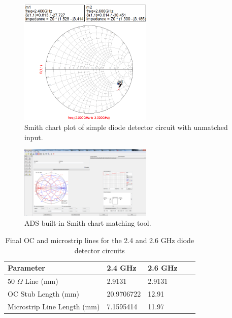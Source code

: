 \documentclass[conference]{IEEEtran}
\begin{document}
\begin{figure}[!htb]
\centering
\includegraphics[width=2.5in]{diode-pics/diodedetectorSimplifiedSmithChart.png}
\caption{Smith chart plot of simple diode detector circuit with unmatched input.}
\label{fig:DDPlot}
\end{figure}

\begin{figure}[!htb]
\centering
\includegraphics[width=2.5in]{diode-pics/smithcharttool.png}
\caption{ADS built-in Smith chart matching tool.}
\label{fig:smithchartTool}
\end{figure}

\begin{table}
   \caption{Final OC and microstrip lines for the 2.4 and 2.6 GHz diode detector circuits}
    \begin{tabular}{|l|l|l|l|l}
   \hline
    Parameter                          & 2.4 GHz    & 2.6 GHz  \\ \hline
    50 $\Omega$ Line (mm)       & 2.9131     & 2.9131   \\ \hline
    OC Stub Length (mm)         & 20.9706722 &    12.91 \\ \hline
    Microstrip Line Length (mm) & 7.1595414  & 11.97    \\ \hline
    \end{tabular}
\label{tab:diodetable}
\end{table}
\end{document}
